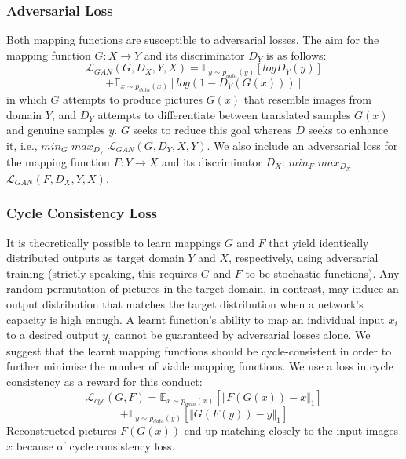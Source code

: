 \documentclass{article}
\begin{document}
\subsubsection{Adversarial Loss}
Both mapping functions are susceptible to adversarial losses\cite{AL}. The aim for the mapping function $G: X \rightarrow Y$ and its discriminator $D_Y$ is as follows:
$$\mathcal{L}_{GAN}(G, D_X, Y, X) = \mathbb{E}_{y \sim p_{data}(y)}[logD_Y(y)] $$$$+ \mathbb{E}_{x \sim p_{data}(x)}[log(1 - D_Y(G(x)))]$$
in which $G$ attempts to produce pictures $G(x)$ that resemble images from domain $Y$, and $D_Y$ attempts to differentiate between translated samples $G(x)$ and genuine samples $y$. $G$ seeks to reduce this goal whereas $D$ seeks to enhance it, i.e., $min_G$ $max_{D_Y}$ $\mathcal{L}_{GAN} (G, D_Y, X, Y)$. We also include an adversarial loss for the mapping function $F: Y \rightarrow X$ and its discriminator $D_X$: $min_F$ $max_{D_X}$ $\mathcal{L}_{GAN}(F, D_X, Y, X)$.
\subsubsection{Cycle Consistency Loss}
It is theoretically possible to learn mappings $G$ and $F$ that yield identically distributed outputs as target domain $Y$ and $X$, respectively, using adversarial training (strictly speaking, this requires $G$ and $F$ to be stochastic functions)\cite{Strictly}. Any random permutation of pictures in the target domain, in contrast, may induce an output distribution that matches the target distribution when a network's capacity is high enough. A learnt function's ability to map an individual input $x_i$ to a desired output $y_i$ cannot be guaranteed by adversarial losses alone. We suggest that the learnt mapping functions should be cycle-consistent in order to further minimise the number of viable mapping functions. We use a loss in cycle consistency as a reward for this conduct:
$$\mathcal{L}_{cyc}(G, F) = \mathbb{E}_{x \sim p_{data}(x)}[\Vert{F(G(x)) - x\Vert}_1] $$$$+ \mathbb{E}_{y \sim p_{data}(y)}[\Vert{G(F(y)) - y\Vert}_1]$$
Reconstructed pictures $F(G(x))$ end up matching closely to the input images $x$ because of cycle consistency loss.
\end{document}
